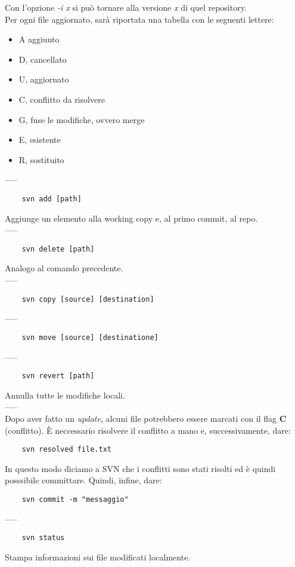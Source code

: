 \documentclass[a4paper]{article}
\begin{document}
	Con l'opzione \textit{-i x} si può tornare alla versione \textit{x} di quel repository.\\
	Per ogni file aggiornato, sarà riportata una tabella con le seguenti lettere:
	\begin{itemize}
		\item A aggiunto
		\item D, cancellato
		\item U, aggiornato
		\item C, conflitto da risolvere
		\item G, fuse le modifiche, ovvero merge
		\item E, esistente
		\item R, sostituito
	\end{itemize}
	-----
	\begin{verbatim}
	svn add [path]
	\end{verbatim}
	Aggiunge un elemento alla working copy e, al primo commit, al repo.\\-----
	\begin{verbatim}
	svn delete [path]
	\end{verbatim}
	Analogo al comando precedente.\\-----
	\begin{verbatim}
	svn copy [source] [destination]
	\end{verbatim}
	-----
	\begin{verbatim}
	svn move [source] [destinatione]
	\end{verbatim}
	-----
	\begin{verbatim}
	svn revert [path]
	\end{verbatim}
	Annulla tutte le modifiche locali.\\-----\\
	Dopo aver fatto un \textit{update}, alcuni file potrebbero essere marcati con il flag \textbf{C} (conflitto). È neccessario risolvere il conflitto a mano e, successivamente, dare:
	\begin{verbatim}
	svn resolved file.txt
	\end{verbatim}
	In questo modo diciamo a SVN che i conflitti sono stati risolti ed è quindi posssibile committare. Quindi, infine, dare:
	\begin{verbatim}
	svn commit -m "messaggio"
	\end{verbatim}
	-----\\
	\begin{verbatim}
	svn status
	\end{verbatim}
	Stampa informazioni sui file modificati localmente.
\end{document}
